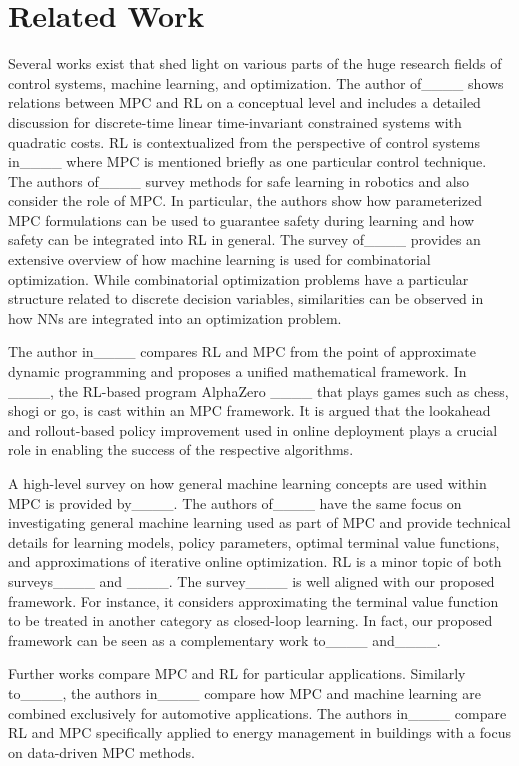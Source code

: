 \section{Related Work}
\label{sec:related}
Several works exist that shed light on various parts of the huge research fields of control systems, machine learning, and optimization.
The author of____ shows relations between \ac{MPC} and \ac{RL} on a conceptual level and includes a detailed discussion for discrete-time linear time-invariant constrained systems with quadratic costs.
\ac{RL} is contextualized from the perspective of control systems in____ where \ac{MPC} is mentioned briefly as one particular control technique.
The authors of____ survey methods for safe learning in robotics and also consider the role of MPC.
In particular, the authors show how parameterized \ac{MPC} formulations can be used to guarantee safety during learning and how safety can be integrated into \ac{RL} in general.
The survey of____ provides an extensive overview of how machine learning is used for combinatorial optimization.
While combinatorial optimization problems have a particular structure related to discrete decision variables, similarities can be observed in how \acp{NN} are integrated into an optimization problem.

The author in____ compares \ac{RL} and \ac{MPC} from the point of approximate dynamic programming and proposes a unified mathematical framework.
In ____, the RL-based program AlphaZero ____ that plays games such as chess, shogi or go, is cast within an MPC framework.
It is argued that the lookahead and rollout-based policy improvement used in online deployment plays a crucial role in enabling the success of the respective algorithms. 

A high-level survey on how general machine learning concepts are used within \ac{MPC} is provided by____. 
The authors of____ have the same focus on investigating general machine learning used as part of \ac{MPC} and provide technical details for learning models, policy parameters, optimal terminal value functions, and approximations of iterative online optimization.
\ac{RL} is a minor topic of both surveys____ and ____. The survey____ is well aligned with our proposed framework. For instance, it considers approximating the terminal value function to be treated in another category as closed-loop learning. In fact, our proposed framework can be seen as a complementary work to____ and____.

Further works compare MPC and RL for particular applications.
Similarly to____, the authors in____ compare how \ac{MPC} and machine learning are combined exclusively for automotive applications.
The authors in____ compare \ac{RL} and \ac{MPC} specifically applied to energy management in buildings with a focus on data-driven \ac{MPC} methods.

